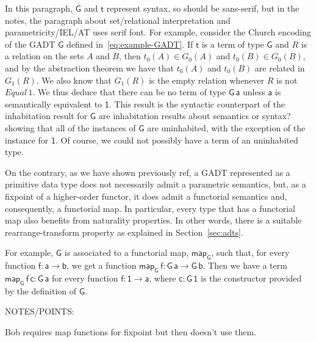 \documentclass[acmsmall,screen,review,anonymous]{acmart}
\theoremstyle{definition}
\newcommand{\map}{\mathsf{map}}
\begin{document}
{\color{blue} In this paragraph, $\mathsf{G}$ and $\mathsf{t}$
  represent syntax, so should be sans-serif, but in the notes, the
  paragraph about set/relational interpretation and
  parametricity/IEL/AT uses serif font.}  For example, consider the
Church encoding of the GADT $\mathsf{G}$ defined
in~\ref{eq:example-GADT}.  If $\mathsf{t}$ is a term of type
$\mathsf{G}$ and $R$ is a relation on the sets $A$ and $B$, then
$t_0(A) \in G_0(A)$ and $t_0(B) \in G_0(B)$, and by the abstraction
theorem we have that $t_0(A)$ and $t_0(B)$ are related in $G_1(R)$.
We also know that $G_1(R)$ is the empty relation whenever $R$ is not
$\mathit{Equal}\,1$.  We thus deduce that there can be no term of type
$\mathsf{G\,a}$ unless $\mathsf{a}$ is semantically equivalent to
$\mathsf{1}$.  This result is the syntactic counterpart of the
inhabitation result for $\mathsf{G}$ {\color{blue} are inhabitation
  results about semantics or syntax?}  showing that all of the
instances of $\mathsf{G}$ are uninhabited, with the exception of the
instance for $\mathsf{1}$.  Of course, we could not possibly have a
term of an uninhabited type.

On the contrary, as we have shown previously {\color{blue} ref}, a
GADT represented as a primitive data type does not necessarily admit a
parametric semantics, but, as a fixpoint of a higher-order functor, it
does admit a functorial semantics and, consequently, a functorial map.
In particular, every type that has a functorial map also benefits from
naturality properties.  In other words, there is a suitable
rearrange-transform property as explained in Section~\ref{sec:adts}.

For example, $\mathsf{G}$ is associated to a functorial map,
$\map_{\mathsf{G}}$, such that, for every function $\mathsf{f : a \to
  b}$, we get a function $\map_{\mathsf{G}}\,\mathsf{f} : \mathsf{G\,a
  \to G\,b}$.  Then we have a term $\map_{\mathsf{G}}\,\mathsf{f\,c} :
\mathsf{G\,a}$ for every function $\mathsf{f : \mathsf{1} \to a}$,
where $\mathsf{c : G\,\mathsf{1}}$ is the constructor provided by the
definition of $\mathsf{G}$.





\vspace*{1in}


NOTES/POINTS:

Bob requires map functions for fixpoint but then doesn't use them.
\end{document}
